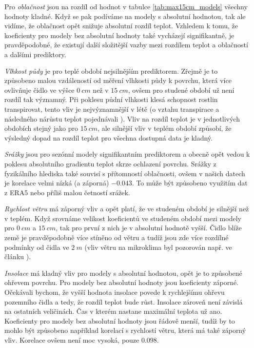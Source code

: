 Pro \textit{oblačnost} jsou na rozdíl od hodnot v tabulce \ref{tab:max15cm_models} všechny hodnoty kladné. Když se pak podíváme na modely s absolutní hodnotou, tak ale vidíme, že oblačnost opět snižuje absolutní rozdíl teplot. Vzhledem k tomu, že koeficienty pro modely bez absolutní hodnoty také vycházejí signifikantně, je pravděpodobné, že existují další složitější vazby mezi rozdílem teplot a oblačností a dalšími prediktory.

\textit{Vlhkost půdy} je pro teplé období nejsilnějším prediktorem. Zřejmě je to způsobeno malou vzdáleností od měření vlhkosti půdy k povrchu, která více ovlivňuje čidlo ve výšce $\SI{0}{cm}$ než v $\SI{15}{cm}$, ovšem pro studené období už není rozdíl tak významný. Při poklesu půdní vlhkosti klesá schopnost rostlin transpirovat, tento vliv je nejvýznamnější v létě (o vztahu transpirace a následného nárůstu teplot pojednávali \cite{snow_deFrenneForestMicroclimates}). Vliv na rozdíl teplot je v jednotlivých obdobích stejný jako pro $\SI{15}{cm}$, ale silnější vliv v teplém období způsobí, že výsledný dopad na rozdíl teplot pro všechna dostupná data je kladný.

\textit{Srážky} jsou pro sezónní modely signifikantním prediktorem a obecně opět vedou k poklesu absolutního gradientu teplot skrze ochlazení povrchu. Srážky z fyzikálního hlediska také souvisí s přítomností oblačnosti, ovšem v našich datech je korelace velmi nízká (a záporná) $-0.043$. To může být způsobeno využitím dat z ERA5 nebo příliš malou četností srážek.

\textit{Rychlost větru} má záporný vliv a opět platí, že ve studeném období je silnější než v teplém. Když srovnáme velikost koeficientů ve studeném období mezi modely pro $\SI{0}{cm}$ a $\SI{15}{cm}$, tak pro první z nich je v absolutní hodnotě vyšší. Čidlo blíže země je pravděpodobně více stíněno od větru a tudíž jsou zde více rozdílné podmínky od čidla ve $\SI{2}{m}$ (vliv větru na mikroklima byl pozorován např. ve článku \cite{wind_contrastingmicroclimates}). 

\textit{Insolace} má kladný vliv pro modely s absolutní hodnotou, opět je to způsobené ohřevem povrchu. Pro modely bez absolutní hodnoty jsou koeficienty záporné. Očekávali bychom, že vyšší hodnota insolace povede k rychlejšímu ohřevu pozemního čidla a tedy, že rozdíl teplot bude růst. Insolace zároveň není závislá na ostatních veličinách. Čas v kterém nastane maximální teplota už ano. Koeficienty pro modely bez absolutní hodnoty jsou řádově menší, tudíž by to mohlo být způsobeno například korelací s rychlostí větru, která má také záporný vliv. Korelace ovšem není moc vysoká, pouze $0.098$.

